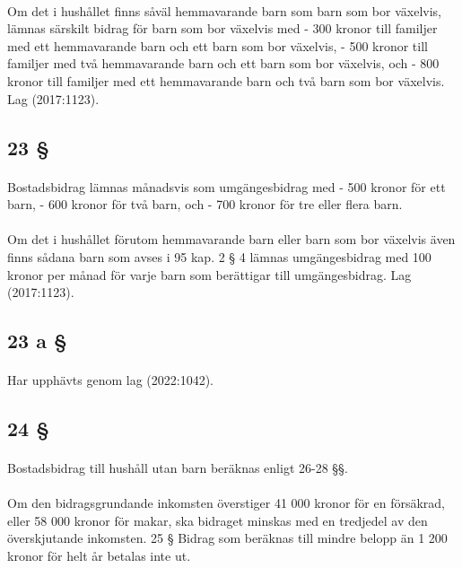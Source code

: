 \documentclass[a4paper,notitlepage,openany,10pt]{book}
\begin{document}
\paragraph*{}
Om det i hushållet finns såväl hemmavarande barn som barn som bor växelvis, lämnas särskilt bidrag för barn som bor växelvis med
\newline - 300 kronor till familjer med ett hemmavarande barn och ett barn som bor växelvis,
\newline - 500 kronor till familjer med två hemmavarande barn och ett barn som bor växelvis, och
\newline - 800 kronor till familjer med ett hemmavarande barn och två barn som bor växelvis.
Lag (2017:1123).
\subsection*{23 §}
\paragraph*{}
Bostadsbidrag lämnas månadsvis som umgängesbidrag med
\newline - 500 kronor för ett barn,
\newline - 600 kronor för två barn, och
\newline - 700 kronor för tre eller flera barn.
\paragraph*{}
Om det i hushållet förutom hemmavarande barn eller barn som bor växelvis även finns sådana barn som avses i 95 kap. 2 § 4 lämnas umgängesbidrag med 100 kronor per månad för varje barn som berättigar till umgängesbidrag.
Lag (2017:1123).
\subsection*{23 a §}
\paragraph*{}
Har upphävts genom
lag (2022:1042).
\subsection*{24 §}
\paragraph*{}
Bostadsbidrag till hushåll utan barn beräknas enligt 26-28 §§.
\paragraph*{}
Om den bidragsgrundande inkomsten överstiger 41 000 kronor för en försäkrad, eller 58 000 kronor för makar, ska bidraget minskas med en tredjedel av den överskjutande inkomsten. 25 § Bidrag som beräknas till mindre belopp än 1 200 kronor för helt år betalas inte ut.
\end{document}
